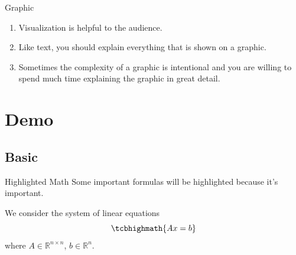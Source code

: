 \documentclass[compress,aspectratio=169]{beamer}
\begin{document}
\begin{frame}{Graphic}
    \begin{enumerate}\setlength{\itemsep}{1em}
        \item Visualization is helpful to the audience.

        \item Like text, you should explain everything that is shown on a graphic.

        \item Sometimes the complexity of a graphic is intentional and you are willing to spend much time explaining the graphic in great detail.
    \end{enumerate}

\end{frame}

\section{Demo}\label{sec:demo}

\subsection{Basic}

\begin{frame}{Highlighted Math}
    Some important formulas will be \alert{highlighted} because it's important.

    \medskip
    We consider the system of linear equations
    \begin{equation}\label{eq:LE}
        \tcbhighmath{Ax = b}
    \end{equation}
    where $A\in\mathbb{R}^{n \times n}$, $b\in\mathbb{R}^n$.
\end{frame}
\end{document}
